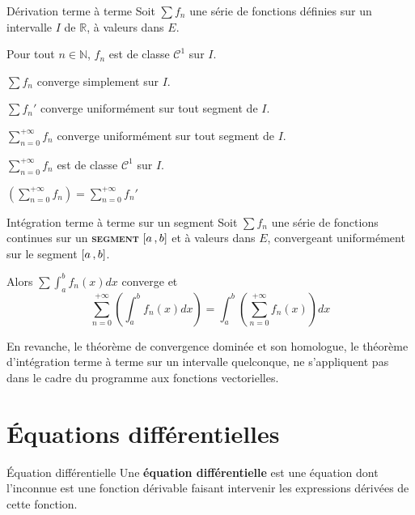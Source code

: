     \begin{theo}{Dérivation terme à terme}{}
        Soit $\sum f_n$ une série de fonctions définies sur un intervalle $I$ de $\mathbb{R}$, à valeurs dans $E$. \begin{suppose}
            \item Pour tout $n \in \mathbb{N}$, $f_n$ est de classe $\mathcal{C}^1$ sur $I$.
            \item $\sum f_n$ converge simplement sur $I$.
            \item $\sum f_n'$ converge uniformément sur tout segment de $I$.
        \end{suppose}
        \begin{alors}
            \item $\sum_{n=0}^{+\infty} f_n$ converge uniformément sur tout segment de $I$.
            \item $\sum_{n=0}^{+\infty} f_n$ est de classe $\mathcal{C}^1$ sur $I$.
            \item $\left(\sum_{n=0}^{+\infty} f_n\right) = \sum_{n=0}^{+\infty} f_n'$
        \end{alors}
    \end{theo}

    \begin{theo}{Intégration terme à terme sur un segment}{}
        Soit $\sum f_n$ une série de fonctions continues sur un \textbf{\textsc{segment}} $\left[ a \, , b \right]$ et à valeurs dans $E$, convergeant uniformément sur le segment $\left[ a \, , b \right]$. 

        Alors $\sum  \int_{a}^{b} f_n(x)dx$ converge et 
        \[ \sum_{n=0}^{+\infty} \left(\int_{a}^{b} f_n(x) dx\right) = \int_{a}^{b} \left(\sum_{n=0}^{+\infty} f_n(x)\right) dx \]
    \end{theo}

    En revanche, le théorème de convergence dominée et son homologue, le théorème d’intégration terme à terme sur un intervalle quelconque, ne s’appliquent pas dans le cadre du programme aux fonctions vectorielles.

\newpage

\section{Équations différentielles}

    \begin{defi}{Équation différentielle}{}
	    Une \textbf{équation différentielle} est une équation dont l’inconnue est une fonction dérivable faisant intervenir les expressions dérivées de cette fonction.
    \end{defi}


